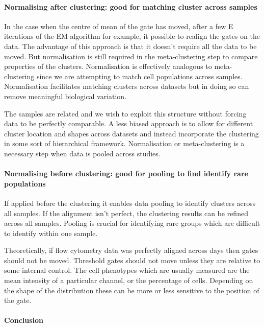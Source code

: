 \paragraph{Normalising after clustering: good for matching cluster across samples}

In the case when the centre of mean of the gate has moved, after a few E iterations of the EM algorithm for example, it possible to realign the gates on the data.
The advantage of this approach is that it doesn’t require all the data to be moved.
But normalisation is still required in the meta-clustering step to compare properties of the clusters.
Normalisation is effectively analogous to meta-clustering since we are attempting to match cell populations across samples.  
Normalisation facilitates matching clusters across datasets but in doing so can remove meaningful biological variation.  

The samples are related and we wish to exploit this structure without forcing data to be perfectly comparable.
A less biased approach is to allow for different cluster location and shapes across datasets and instead incorporate the clustering in some sort of hierarchical framework.  
Normalisation or meta-clustering is a necessary step when data is pooled across studies.


\paragraph{Normalising before clustering: good for pooling to find identify rare populations}

If applied before the clustering it enables data pooling to identify clusters across all samples.
If the alignment isn’t perfect, the clustering results can be refined across all samples.
Pooling is crucial for identifying rare groups which are difficult to identify within one sample.

Theoretically, if flow cytometry data was perfectly aligned across days then gates should not be moved.  
Threshold gates should not move unless they are relative to some internal control.
The cell phenotypes which are usually measured are the mean intensity of a particular channel, or the percentage of cells.
Depending on the shape of the distribution these can be more or less sensitive to the position of the gate.


\paragraph{Conclusion}

